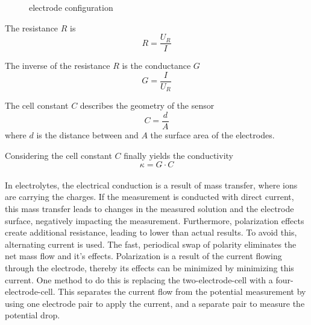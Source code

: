\begin{figure}
	\begin{center}
    	\tikzset{external/export next=false}
		\caption{electrode configuration}
		\label{fig:elec}
	\end{center}
\end{figure}

The resistance $ R $ is
\begin{equation}
	R = \dfrac{U_R}{I}
\label{eq:R}
\end{equation}

The inverse of the resistance $ R $ is the conductance $ G $
\begin{equation}
	G = \dfrac{I}{U_R}
\label{eq:G}
\end{equation}

The cell constant $ C $ describes the geometry of the sensor
\begin{equation}
	C = \dfrac{d}{A}
\label{eq:C}
\end{equation}
where $ d $ is the distance between and $ A $ the surface area of  the electrodes. 

Considering the cell constant $ C $ finally yields the conductivity
\begin{equation}
	\kappa = G \cdot C
\label{eq:kappa} 
\end{equation}
\\

In electrolytes, the electrical conduction is a result of mass transfer, where ions are carrying the charges. If the measurement is conducted with direct current, this mass transfer leads to changes in the measured solution and the electrode surface, negatively impacting the measurement. Furthermore, polarization effects create additional resistance, leading to lower than actual results. To avoid this, alternating current is used. The fast, periodical swap of polarity eliminates the net mass flow and it's effects. Polarization is a result of the current flowing through the electrode, thereby its effects can be minimized by minimizing this current. One method to do this is replacing the two-electrode-cell with a four-electrode-cell.
This separates the current flow from the potential measurement by using one electrode pair to apply the current, and a separate pair to measure the potential drop. \\

